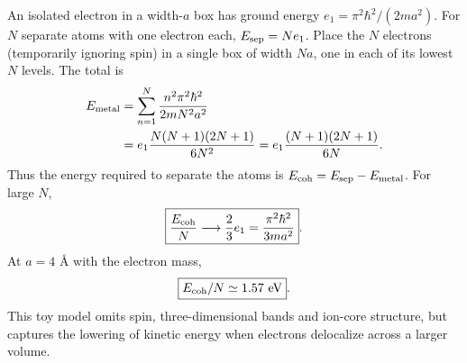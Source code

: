 An isolated electron in a width-$a$ box has
ground energy $e_1=\pi^2\hbar^2/(2ma^2)$.
For $N$ separate atoms with one electron each,
$E_{\rm sep}=Ne_1$.
Place the $N$ electrons (temporarily ignoring spin)
in a single box of width $Na$, one in each
of its lowest $N$ levels. The total is
\begin{align}
E_{\rm metal}
&=\sum_{n=1}^N\frac{n^2\pi^2\hbar^2}{2mN^2a^2}\\
&=e_1\frac{N(N+1)(2N+1)}{6N^2}
=e_1\frac{(N+1)(2N+1)}{6N}.
\end{align}
Thus the energy required to separate the atoms is
$E_{\rm coh}=E_{\rm sep}-E_{\rm metal}$.
For large $N$,
\begin{equation}
\boxed{\frac{E_{\rm coh}}{N}\longrightarrow
\frac23 e_1=\frac{\pi^2\hbar^2}{3ma^2}}.
\end{equation}
At $a=4$ \AA{} with the electron mass,
\begin{equation}
\boxed{E_{\rm coh}/N\simeq1.57\ \mathrm{eV}}.
\end{equation}
This toy model omits spin, three-dimensional
bands and ion-core structure, but captures
the lowering of kinetic energy when electrons
delocalize across a larger volume.

